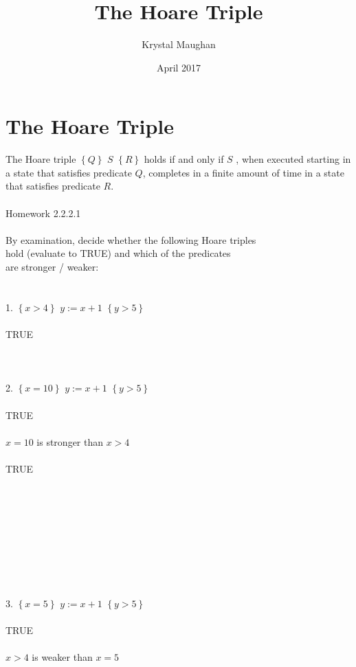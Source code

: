 \documentclass{article}
\title{The Hoare Triple}
\author{Krystal Maughan }
\date{April 2017}
\begin{document}
\maketitle

\section{The Hoare Triple}
The Hoare triple
$\left\{Q\right\}$ $S$ $\left\{R\right\}$
holds if and only if $S$
, when executed
starting in a state that satisfies
predicate $Q$,
completes in a finite 
amount of time in a state
that satisfies predicate $R$.
\\
\\
Homework 2.2.2.1
\\
\\
By examination, decide whether the following Hoare triples
\\
hold (evaluate to TRUE) and which of the predicates 
\\
are stronger / weaker:
\\
\\
\\
1. $\left\{x > 4\right\}$ $y := x + 1$ $\left\{y > 5\right\}$
\\
\\
TRUE
\\
\\
\\
\\
2. $\left\{x = 10\right\}$ $ y:= x + 1$ $\left\{y > 5\right\}$
\\
\\
TRUE
\\
\\
$x = 10$ is stronger than $x > 4$
\\
\\
TRUE
\\
\\
\\
\\
\\
\\
\\
\\
\\
\\
3. $\left\{x = 5\right\}$ $y := x + 1$ $\left\{y > 5\right\}$
\\
\\
TRUE
\\
\\
$ x > 4 $ is weaker than $ x = 5$
\\
\end{document}
